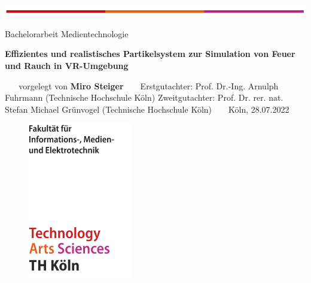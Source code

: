 \documentclass[a4paper,11pt]{article} %
\renewcommand{\\}{\vspace*{0.5\baselineskip} \newline}
\begin{document}

\begin{titlepage}
	\begin{flushleft}
		\includegraphics[width=\textwidth]{Grafiken/TH/TH.png}\\
		\vspace*{2cm}
	\end{flushleft}

	\begin{flushleft}
		Bachelorarbeit Medientechnologie
	\end{flushleft}

	\begin{huge}
		\noindent
		\bfseries
		Effizientes und realistisches Partikelsystem zur Simulation von Feuer und Rauch in VR-Umgebung \\
	\end{huge}
	~\\
	~\\
	\noindent
	vorgelegt von                   \\
	\textbf{Miro Steiger}			\\
	~\\
	~\\
	\noindent
	Erstgutachter: Prof. Dr.-Ing. Arnulph Fuhrmann (Technische Hochschule Köln)              \\
	Zweitgutachter:  Prof. Dr. rer. nat. Stefan Michael Grünvogel (Technische Hochschule Köln)
	~\\
	~\\
	Köln, 28.07.2022
	~\\
	~\\
	\begin{figure}[b]
		\begin{flushright}
			\includegraphics[scale=1]{Grafiken/TH/TH_F07_cover.png}\\
		\end{flushright}
	\end{figure}

	\pagestyle{fancy}
\end{titlepage}
\end{document}
